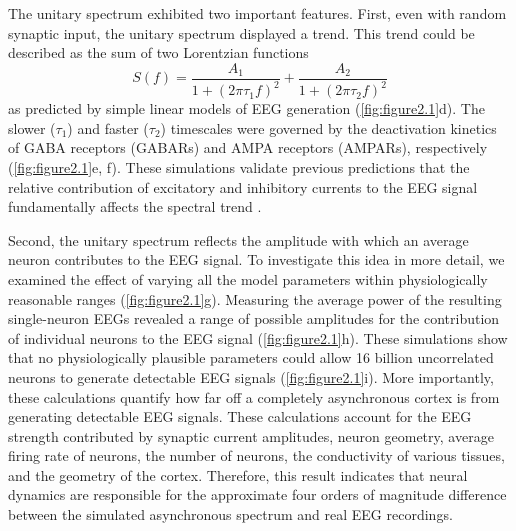\begin{figure}[t!]
{\begin{minipage}[c]{177mm}
    \label{fig:figure2.1}
    \end{minipage}
    }
\end{figure}

The unitary spectrum exhibited two important features. First, even with random synaptic input, the unitary spectrum displayed a trend. This trend could be described as the sum of two Lorentzian functions
\begin{equation} \label{eq:linear_model}
    S(f) = \frac{A_1}{1+(2\pi \tau_1 f)^2} + \frac{A_2}{1+(2\pi \tau_2 f)^2}
\end{equation}
as predicted by simple linear models of EEG generation \cite{Gao2017,Miller2009} (\autoref{fig:figure2.1}d). The slower ($\tau_1$) and faster ($\tau_2$) timescales were governed by the deactivation kinetics of GABA receptors (GABARs) and AMPA receptors (AMPARs), respectively (\autoref{fig:figure2.1}e, f). These simulations validate previous predictions that the relative contribution of excitatory and inhibitory currents to the EEG signal fundamentally affects the spectral trend \cite{Gao2017}.

Second, the unitary spectrum reflects the amplitude with which an average neuron contributes to the EEG signal. To investigate this idea in more detail, we examined the effect of varying all the model parameters within physiologically reasonable ranges (\autoref{fig:figure2.1}g). Measuring the average power of the resulting single-neuron EEGs revealed a range of possible amplitudes for the contribution of individual neurons to the EEG signal (\autoref{fig:figure2.1}h). These simulations show that no physiologically plausible parameters could allow 16 billion uncorrelated neurons to generate detectable EEG signals (\autoref{fig:figure2.1}i). More importantly, these calculations quantify how far off a completely asynchronous cortex is from generating detectable EEG signals. These calculations account for the EEG strength contributed by synaptic current amplitudes, neuron geometry, average firing rate of neurons, the number of neurons, the conductivity of various tissues, and the geometry of the cortex. Therefore, this result indicates that neural dynamics are responsible for the approximate four orders of magnitude difference between the simulated asynchronous spectrum and real EEG recordings.

